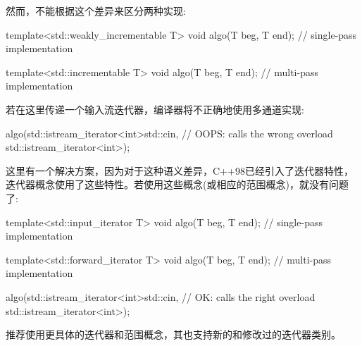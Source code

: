 然而，不能根据这个差异来区分两种实现:

\begin{cpp}
template<std::weakly_incrementable T>
void algo(T beg, T end); // single-pass implementation

template<std::incrementable T>
void algo(T beg, T end); // multi-pass implementation
\end{cpp}

若在这里传递一个输入流迭代器，编译器将不正确地使用多通道实现:

\begin{cpp}
algo(std::istream_iterator<int>{std::cin}, // OOPS: calls the wrong overload
	 std::istream_iterator<int>{});
\end{cpp}

这里有一个解决方案，因为对于这种语义差异，C++98已经引入了迭代器特性，迭代器概念使用了这些特性。若使用这些概念(或相应的范围概念)，就没有问题了:

\begin{cpp}
template<std::input_iterator T>
void algo(T beg, T end); // single-pass implementation

template<std::forward_iterator T>
void algo(T beg, T end); // multi-pass implementation

algo(std::istream_iterator<int>{std::cin}, // OK: calls the right overload
	std::istream_iterator<int>{});
\end{cpp}

推荐使用更具体的迭代器和范围概念，其也支持新的和修改过的迭代器类别。


















